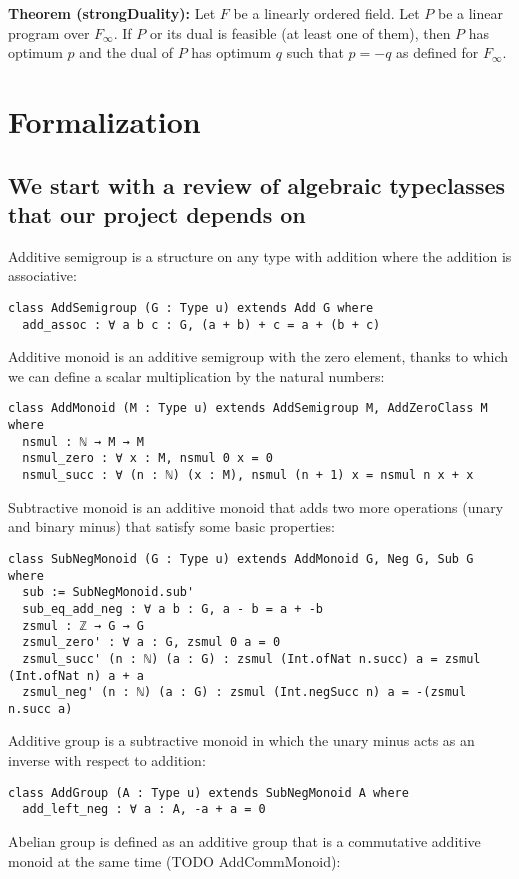 \documentclass[]{article}
\renewcommand{\.}{\hskip .75pt}
\begin{document}
\medskip \noindent
\textbf{Theorem (strongDuality):}
Let $F$ be a linearly ordered field.
Let $P$ be a linear program over $F_\infty$.
If $P$ or its dual is feasible (at least one of them),
then $P$ has optimum $p$ and the dual of $P$ has optimum $q$ such that
$p = -q$ as defined for $F_\infty$.

\section{Formalization}

\subsection{We start with a review of algebraic typeclasses that our project depends on}

Additive semigroup is a structure on any type with addition where the addition is associative:
\begin{lstlisting}
class AddSemigroup (G : Type u) extends Add G where
  add_assoc : ∀ a b c : G, (a + b) + c = a + (b + c)
\end{lstlisting}
Additive monoid is an additive semigroup with the zero element, thanks to which we can
define a scalar multiplication by the natural numbers:
\begin{lstlisting}
class AddMonoid (M : Type u) extends AddSemigroup M, AddZeroClass M where
  nsmul : ℕ → M → M
  nsmul_zero : ∀ x : M, nsmul 0 x = 0 
  nsmul_succ : ∀ (n : ℕ) (x : M), nsmul (n + 1) x = nsmul n x + x 
\end{lstlisting}
Subtractive monoid is an additive monoid that adds two more operations (unary and binary minus)
that satisfy some basic properties:
\begin{lstlisting}
class SubNegMonoid (G : Type u) extends AddMonoid G, Neg G, Sub G where
  sub := SubNegMonoid.sub'
  sub_eq_add_neg : ∀ a b : G, a - b = a + -b 
  zsmul : ℤ → G → G
  zsmul_zero' : ∀ a : G, zsmul 0 a = 0 
  zsmul_succ' (n : ℕ) (a : G) : zsmul (Int.ofNat n.succ) a = zsmul (Int.ofNat n) a + a
  zsmul_neg' (n : ℕ) (a : G) : zsmul (Int.negSucc n) a = -(zsmul n.succ a)
\end{lstlisting}
Additive group is a subtractive monoid in which the unary minus acts as an inverse with respect to addition:
\begin{lstlisting}
class AddGroup (A : Type u) extends SubNegMonoid A where
  add_left_neg : ∀ a : A, -a + a = 0
\end{lstlisting}
Abelian group is defined as an additive group that is a commutative additive monoid at the same time (TODO AddCommMonoid):
\end{document}
